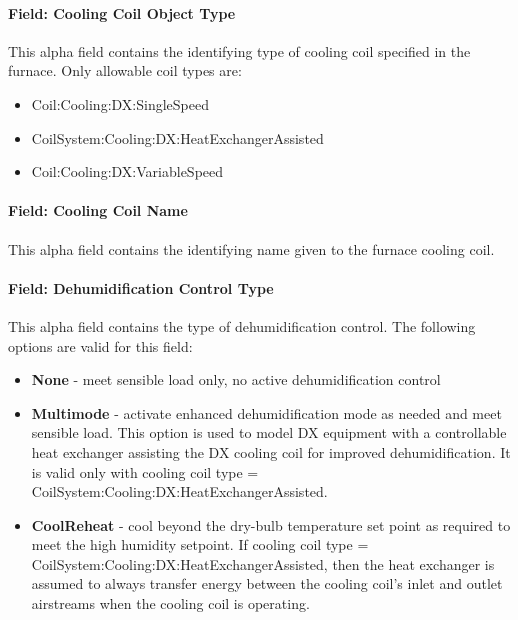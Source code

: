\paragraph{Field: Cooling Coil Object Type}\label{field-cooling-coil-object-type-1-000}

This alpha field contains the identifying type of cooling coil specified in the furnace. Only allowable coil types are:

\begin{itemize}
\item
  Coil:Cooling:DX:SingleSpeed
\item
  CoilSystem:Cooling:DX:HeatExchangerAssisted
\item
  Coil:Cooling:DX:VariableSpeed
\end{itemize}

\paragraph{Field: Cooling Coil Name}\label{field-cooling-coil-name-1-000}

This alpha field contains the identifying name given to the furnace cooling coil.

\paragraph{Field: Dehumidification Control Type}\label{field-dehumidification-control-type-1-000}

This alpha field contains the type of dehumidification control. The following options are valid for this field:

\begin{itemize}
\item
  \textbf{None} - meet sensible load only, no active dehumidification control
\item
  \textbf{Multimode} - activate enhanced dehumidification mode as needed and meet sensible load. This option is used to model DX equipment with a controllable heat exchanger assisting the DX cooling coil for improved dehumidification. It is valid only with cooling coil type = CoilSystem:Cooling:DX:HeatExchangerAssisted.
\item
  \textbf{CoolReheat} - cool beyond the dry-bulb temperature set point as required to meet the high humidity setpoint. If cooling coil type = CoilSystem:Cooling:DX:HeatExchangerAssisted, then the heat exchanger is assumed to always transfer energy between the cooling coil's inlet and outlet airstreams when the cooling coil is operating.
\end{itemize}


